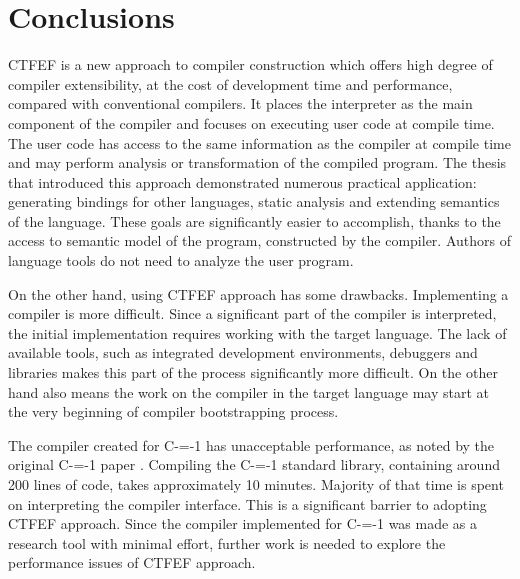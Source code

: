 \section{Conclusions}

CTFEF is a new approach to compiler construction which offers high degree of compiler extensibility, at the cost of development time and performance, compared with conventional compilers.
It places the interpreter as the main component of the compiler and focuses on executing user code at compile time.
The user code has access to the same information as the compiler at compile time and may perform analysis or transformation of the compiled program.
The thesis that introduced this approach \cite{grabski2020} demonstrated numerous practical application: generating bindings for other languages, static analysis and extending semantics of the language.
These goals are significantly easier to accomplish, thanks to the access to semantic model of the program, constructed by the compiler.
Authors of language tools do not need to analyze the user program.

On the other hand, using CTFEF approach has some drawbacks. Implementing a compiler is more difficult.
Since a significant part of the compiler is interpreted, the initial implementation requires working with the target language.
The lack of available tools, such as integrated development environments, debuggers and libraries makes this part of the process significantly more difficult.
On the other hand also means the work on the compiler in the target language may start at the very beginning of compiler bootstrapping process\cite{puntambekar:compiler_design,novillo2007gcc}.

The compiler created for C-=-1 has unacceptable performance, as noted by the original C-=-1 paper \cite{grabski2022compilation}.
Compiling the C-=-1 standard library, containing around 200 lines of code, takes approximately 10 minutes.
Majority of that time is spent on interpreting the compiler interface.
This is a significant barrier to adopting CTFEF approach.
Since the compiler implemented for C-=-1 was made as a research tool with minimal effort, further work is needed to explore the performance issues of CTFEF approach.
